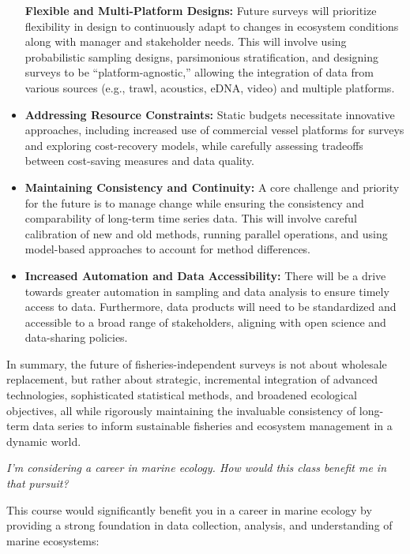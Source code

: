 \documentclass[
  letterpaper,
  oneside,
  open=any]{scrbook}
\begin{document}
\begin{itemize}
  \textbf{Flexible and Multi-Platform Designs:} Future surveys will
  prioritize flexibility in design to continuously adapt to changes in
  ecosystem conditions along with manager and stakeholder needs. This
  will involve using probabilistic sampling designs, parsimonious
  stratification, and designing surveys to be ``platform-agnostic,''
  allowing the integration of data from various sources (e.g., trawl,
  acoustics, eDNA, video) and multiple platforms.
\item
  \textbf{Addressing Resource Constraints:} Static budgets necessitate
  innovative approaches, including increased use of commercial vessel
  platforms for surveys and exploring cost-recovery models, while
  carefully assessing tradeoffs between cost-saving measures and data
  quality.
\item
  \textbf{Maintaining Consistency and Continuity:} A core challenge and
  priority for the future is to manage change while ensuring the
  consistency and comparability of long-term time series data. This will
  involve careful calibration of new and old methods, running parallel
  operations, and using model-based approaches to account for method
  differences.
\item
  \textbf{Increased Automation and Data Accessibility:} There will be a
  drive towards greater automation in sampling and data analysis to
  ensure timely access to data. Furthermore, data products will need to
  be standardized and accessible to a broad range of stakeholders,
  aligning with open science and data-sharing policies.
\end{itemize}

In summary, the future of fisheries-independent surveys is not about
wholesale replacement, but rather about strategic, incremental
integration of advanced technologies, sophisticated statistical methods,
and broadened ecological objectives, all while rigorously maintaining
the invaluable consistency of long-term data series to inform
sustainable fisheries and ecosystem management in a dynamic world.

\emph{I'm considering a career in marine ecology. How would this class
benefit me in that pursuit?}

This course would significantly benefit you in a career in marine
ecology by providing a strong foundation in data collection, analysis,
and understanding of marine ecosystems:
\end{document}
